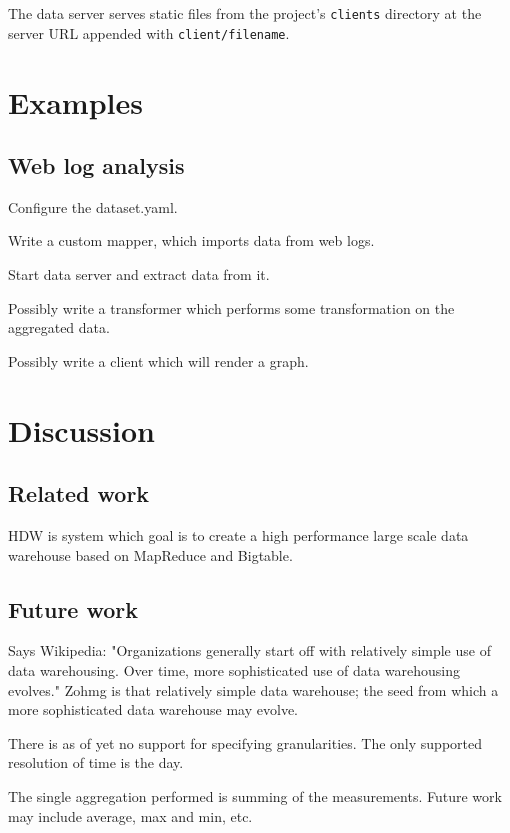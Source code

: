 \documentclass[a4paper,10pt]{book}
\begin{document}
The data server serves static files from the project's \texttt{clients}
directory at the server URL appended with \texttt{client/filename}.



\chapter{Examples}

\section{Web log analysis}

Configure the dataset.yaml.

Write a custom mapper, which imports data from web logs.

Start data server and extract data from it.

Possibly write a transformer which performs some transformation on the
aggregated data.

Possibly write a client which will render a graph.



\chapter{Discussion}

\section{Related work}

HDW is system which goal is to create a high performance large scale data
warehouse based on MapReduce and Bigtable. \cite{hdw}



\section{Future work}

Says Wikipedia: "Organizations generally start off with relatively simple use of data warehousing. Over time, more sophisticated use of data warehousing evolves." Zohmg is that relatively simple data warehouse; the seed from which a more sophisticated data warehouse may evolve.

There is as of yet no support for specifying granularities. The only supported resolution of time is the day.

The single aggregation performed is summing of the measurements. Future work may include average, max and min, etc.
\end{document}
